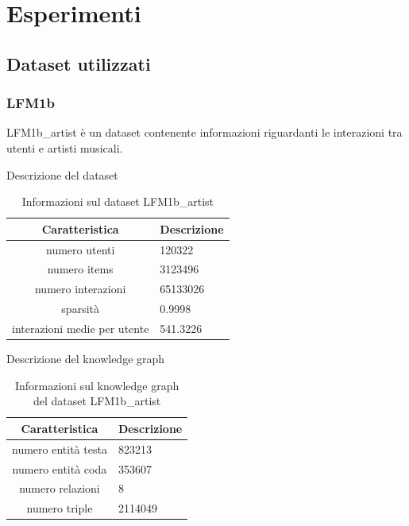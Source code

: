 \section{Esperimenti}

\subsection{Dataset utilizzati}
\subsubsection{LFM1b}


LFM1b\_artist è un dataset contenente informazioni riguardanti le interazioni tra utenti e artisti musicali.

\noindent Descrizione del dataset
\begin{table}[H]
    \centering
    \footnotesize
    \begin{tabularx}{\textwidth}{|c|X|}
        \hline
        \textbf{Caratteristica} & \textbf{Descrizione} \\
        \hline
        numero utenti & 120322 \\
        \hline
        numero items & 3123496 \\
        \hline
        numero interazioni & 65133026 \\
        \hline
        sparsità & 0.9998 \\
        \hline
        interazioni medie per utente & 541.3226 \\
        \hline
    \end{tabularx}
    \caption{Informazioni sul dataset LFM1b\_artist}
    \label{tab:dataset_info}
\end{table}


\noindent Descrizione del knowledge graph
\begin{table}[H]
    \centering
    \footnotesize
    \begin{tabularx}{\textwidth}{|c|X|}
        \hline
        \textbf{Caratteristica} & \textbf{Descrizione} \\
        \hline
        numero entità testa & 823213 \\
        \hline
        numero entità coda & 353607 \\
        \hline
        numero relazioni & 8 \\
        \hline
        numero triple & 2114049 \\
        \hline
    \end{tabularx}
    \caption{Informazioni sul knowledge graph del dataset LFM1b\_artist}
    \label{tab:dataset_info}
\end{table}



